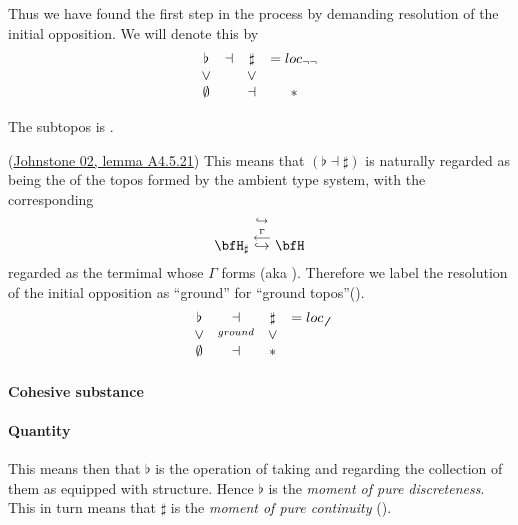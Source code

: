 Thus we have found the first step in the process by demanding resolution of the initial opposition. We will denote this by
\begin{displaymath}
\begin{matrix}
\flat &\dashv& \sharp & = loc_{\neg \neg}
\\
\vee && \vee
\\
\emptyset &&\dashv& \ast
\end{matrix}
\end{displaymath}
\begin{prop}
\label{}\hypertarget{}{}
The  subtopos is .
\end{prop}
(\hyperlink{Johnstone02}{Johnstone 02, lemma A4.5.21})
This means that $(\flat \dashv \sharp)$ is naturally regarded as being the  of the topos formed by the ambient type system, with the corresponding 
\begin{displaymath}
\bfH_{\sharp}
\stackrel{\hookrightarrow}{\stackrel{\stackrel{\Gamma}{\longleftarrow}}{\hookrightarrow}}
\bfH
\end{displaymath}
regarded as the termimal  whose  $\Gamma$ forms  (aka ).
Therefore we label the resolution of the initial opposition as ``ground'' for ``ground topos''().
\begin{displaymath}
\begin{matrix}
\flat &\dashv& \sharp & = loc_{\not\not}
\\
\vee &\stackrel{ground}{}& \vee
\\
\emptyset &\dashv& \ast
\end{matrix}
\end{displaymath}
\hypertarget{cohesive_substance}{}\paragraph*{{Cohesive substance}}\label{cohesive_substance}
\hypertarget{IntensiveExtensive}{}\paragraph*{{Quantity}}\label{IntensiveExtensive}
This means then that $\flat$ is the operation of taking  and regarding the collection of them as equipped with  structure. Hence $\flat$ is the \emph{moment of pure discreteness}.
This in turn means that $\sharp$ is the \emph{moment of pure continuity} ().
